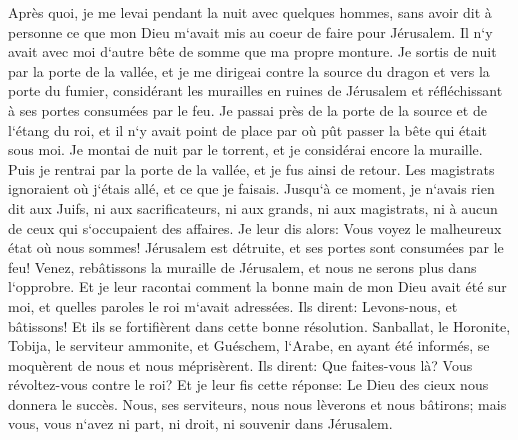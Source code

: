 \verse Après quoi, je me levai pendant la nuit avec quelques hommes, sans avoir dit à personne ce que mon Dieu m`avait mis au coeur de faire pour Jérusalem. Il n`y avait avec moi d`autre bête de somme que ma propre monture. 
\verse Je sortis de nuit par la porte de la vallée, et je me dirigeai contre la source du dragon et vers la porte du fumier, considérant les murailles en ruines de Jérusalem et réfléchissant à ses portes consumées par le feu. 
\verse Je passai près de la porte de la source et de l`étang du roi, et il n`y avait point de place par où pût passer la bête qui était sous moi. 
\verse Je montai de nuit par le torrent, et je considérai encore la muraille. Puis je rentrai par la porte de la vallée, et je fus ainsi de retour. 
\verse Les magistrats ignoraient où j`étais allé, et ce que je faisais. Jusqu`à ce moment, je n`avais rien dit aux Juifs, ni aux sacrificateurs, ni aux grands, ni aux magistrats, ni à aucun de ceux qui s`occupaient des affaires. 
\verse Je leur dis alors: Vous voyez le malheureux état où nous sommes! Jérusalem est détruite, et ses portes sont consumées par le feu! Venez, rebâtissons la muraille de Jérusalem, et nous ne serons plus dans l`opprobre. 
\verse Et je leur racontai comment la bonne main de mon Dieu avait été sur moi, et quelles paroles le roi m`avait adressées. Ils dirent: Levons-nous, et bâtissons! Et ils se fortifièrent dans cette bonne résolution. 
\verse Sanballat, le Horonite, Tobija, le serviteur ammonite, et Guéschem, l`Arabe, en ayant été informés, se moquèrent de nous et nous méprisèrent. Ils dirent: Que faites-vous là? Vous révoltez-vous contre le roi? 
\verse Et je leur fis cette réponse: Le Dieu des cieux nous donnera le succès. Nous, ses serviteurs, nous nous lèverons et nous bâtirons; mais vous, vous n`avez ni part, ni droit, ni souvenir dans Jérusalem. 

